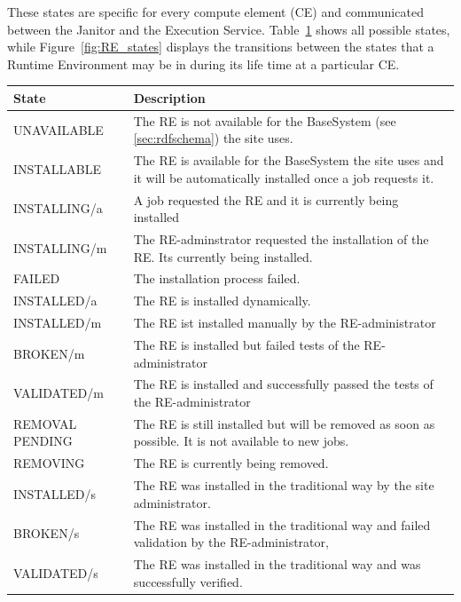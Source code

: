 These states are specific for every compute element (CE) and communicated
between the Janitor and the Execution Service. Table~\ref{tab:states} shows all
possible states, while Figure~\ref{fig:RE_states}
displays the transitions between the states that a Runtime Environment may
be in during its life time at a particular CE.   



\begin{table}[!h]
 \begin{center}
 \begin{tabular}{lp{12cm}}
 State&Description\\
 \hline
 UNAVAILABLE&
	The RE is not available for the BaseSystem (see \ref{sec:rdfschema}) the site uses. \\
 INSTALLABLE&
	The RE is available for the BaseSystem the site uses and it
	will be automatically installed once a job requests it. \\
 INSTALLING/a&
	A job requested the RE and it is currently being installed \\
 INSTALLING/m&
	The RE-adminstrator requested the installation of the RE. Its
	currently being installed. \\
 FAILED&
	The installation process failed. \\
 INSTALLED/a&
	The RE is installed dynamically. \\
 INSTALLED/m&
	The RE ist installed manually by the RE-administrator \\
 BROKEN/m&
	The RE is installed but failed tests of the RE-administrator \\
 VALIDATED/m&
	The RE is installed and successfully passed the tests of the
	RE-administrator \\
 REMOVAL PENDING&
	The RE is still installed but will be removed as soon as
	possible. It is not available to new jobs. \\
 REMOVING&
	The RE is currently being removed. \\
 INSTALLED/s&
	The RE was installed in the traditional way by the site administrator. \\
 BROKEN/s&
	The RE was installed in the traditional way and failed
	validation by the RE-administrator, \\
 VALIDATED/s&
	The RE was installed in the traditional way and was
	successfully verified.
 \\
 \end{tabular}
 \end{center}
 \label{tab:states}
 \end{table}

